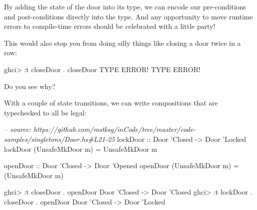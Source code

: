 \documentclass[]{article}
\newenvironment{Shaded}{}{}
\newcommand{\DataTypeTok}[1]{\textcolor[rgb]{0.56,0.13,0.00}{#1}}
\newcommand{\CharTok}[1]{\textcolor[rgb]{0.25,0.44,0.63}{#1}}
\newcommand{\CommentTok}[1]{\textcolor[rgb]{0.38,0.63,0.69}{\textit{#1}}}
\newcommand{\OtherTok}[1]{\textcolor[rgb]{0.00,0.44,0.13}{#1}}
\newcommand{\FunctionTok}[1]{\textcolor[rgb]{0.02,0.16,0.49}{#1}}
\newcommand{\NormalTok}[1]{#1}
\begin{document}
By adding the state of the door into its type, we can encode our pre-conditions
and post-conditions directly into the type. And any opportunity to move runtime
errors to compile-time errors should be celebrated with a little party!

This would also stop you from doing silly things like closing a door twice in a
row:

\begin{Shaded}
\begin{Highlighting}[]
\NormalTok{ghci}\FunctionTok{>} \FunctionTok{:}\NormalTok{t closeDoor }\FunctionTok{.}\NormalTok{ closeDoor}
\DataTypeTok{TYPE} \DataTypeTok{ERROR}\FunctionTok{!}  \DataTypeTok{TYPE} \DataTypeTok{ERROR}\FunctionTok{!}
\end{Highlighting}
\end{Shaded}

Do you see why?

With a couple of state transitions, we can write compositions that are
typechecked to all be legal:

\begin{Shaded}
\begin{Highlighting}[]
\CommentTok{-- source: https://github.com/mstksg/inCode/tree/master/code-samples/singletons/Door.hs#L21-25}
\OtherTok{lockDoor ::} \DataTypeTok{Door} \CharTok{'Closed -> Door '}\DataTypeTok{Locked}
\NormalTok{lockDoor (}\DataTypeTok{UnsafeMkDoor}\NormalTok{ m) }\FunctionTok{=} \DataTypeTok{UnsafeMkDoor}\NormalTok{ m}

\OtherTok{openDoor ::} \DataTypeTok{Door} \CharTok{'Closed -> Door '}\DataTypeTok{Opened}
\NormalTok{openDoor (}\DataTypeTok{UnsafeMkDoor}\NormalTok{ m) }\FunctionTok{=}\NormalTok{ (}\DataTypeTok{UnsafeMkDoor}\NormalTok{ m)}
\end{Highlighting}
\end{Shaded}

\begin{Shaded}
\begin{Highlighting}[]
\NormalTok{ghci}\FunctionTok{>} \FunctionTok{:}\NormalTok{t closeDoor }\FunctionTok{.}\NormalTok{ openDoor}
\DataTypeTok{Door} \CharTok{'Closed -> Door '}\DataTypeTok{Closed}
\NormalTok{ghci}\FunctionTok{>} \FunctionTok{:}\NormalTok{t lockDoor }\FunctionTok{.}\NormalTok{ closeDoor }\FunctionTok{.}\NormalTok{ openDoor}
\DataTypeTok{Door} \CharTok{'Closed -> Door '}\DataTypeTok{Locked}
\end{Highlighting}
\end{Shaded}
\end{document}
